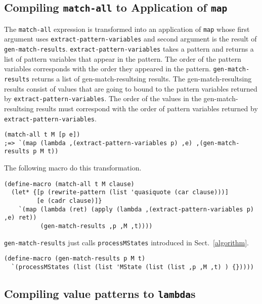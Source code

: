 \documentclass[acmlarge]{acmart}
\begin{document}
\subsection{Compiling \texttt{match-all} to Application of \texttt{map}}

The \texttt{match-all} expression is transformed into an application of \texttt{map} whose first argument uses \texttt{extract-pattern-variables} and second argument is the result of \texttt{gen-match-results}.
\texttt{extract-pattern-variables} takes a pattern and returns a list of pattern variables that appear in the pattern.
The order of the pattern variables corresponds with the order they appeared in the pattern.
\texttt{gen-match-results} returns a list of gen-match-resultsing results.
The gen-match-resultsing results consist of values that are going to bound to the pattern variables returned by \texttt{extract-pattern-variables}.
The order of the values in the gen-match-resultsing results must correspond with the order of pattern variables returned by \texttt{extract-pattern-variables}.

\begin{lstlisting}[language=egison]
(match-all t M [p e])
;=> `(map (lambda ,(extract-pattern-variables p) ,e) ,(gen-match-results p M t))
\end{lstlisting}

The following macro do this transformation.

\begin{lstlisting}[language=egison]
(define-macro (match-all t M clause)
  (let* {[p (rewrite-pattern (list 'quasiquote (car clause)))]
         [e (cadr clause)]}
    `(map (lambda (ret) (apply (lambda ,(extract-pattern-variables p) ,e) ret))
          (gen-match-results ,p ,M ,t))))
\end{lstlisting}

\texttt{gen-match-results} just calls \texttt{processMStates} introduced in Sect.~\ref{algorithm}.

\begin{lstlisting}[language=egison]
(define-macro (gen-match-results p M t)
  `(processMStates (list (list 'MState (list (list ,p ,M ,t) ) {}))))
\end{lstlisting}

\subsection{Compiling value patterns to \texttt{lambda}s}
\end{document}
